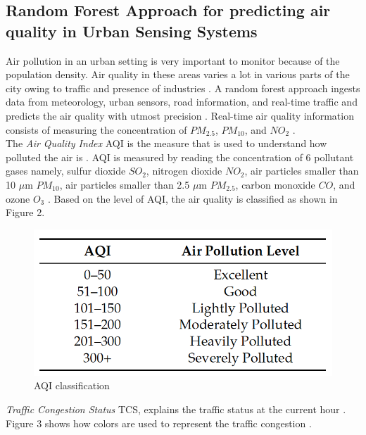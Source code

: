 \documentclass[sigconf]{acmart}
\begin{document}
\subsection{Random Forest Approach for predicting air quality in Urban Sensing Systems}
Air pollution in an urban setting is very important to monitor because of the population density. Air quality in these areas varies a lot in various parts of the city owing to traffic and presence of industries \cite{raq2016}. A random forest approach ingests data from meteorology, urban sensors, road information, and real-time traffic and predicts the air quality with utmost precision \cite{raq2016}. Real-time air quality information consists of measuring the concentration of $PM_{2.5}$, $PM_{10}$, and $NO_{2}$ \cite{raq2016}. \\
The {\em Air Quality Index} AQI is the measure that is used to understand how polluted the air is \cite{raq2016}. AQI is measured by reading the concentration of 6 pollutant gases namely, sulfur dioxide $SO_{2}$, nitrogen dioxide $NO_{2}$, air particles smaller than 10 $\mu$m $PM_{10}$, air particles smaller than 2.5 $\mu$m $PM_{2.5}$, carbon monoxide $CO$, and ozone $O_3$ \cite{raq2016}. Based on the level of AQI, the air quality is classified as shown in Figure 2. 

\begin{figure}
\includegraphics[width=1.0\textwidth]{images/fig2.png}
\caption{AQI classification \cite{raq2016}}
\end{figure}

{\em Traffic Congestion Status} TCS, explains the traffic status at the current hour \cite{raq2016}. Figure 3 shows how colors are used to represent the traffic congestion \cite{raq2016}.
\end{document}

